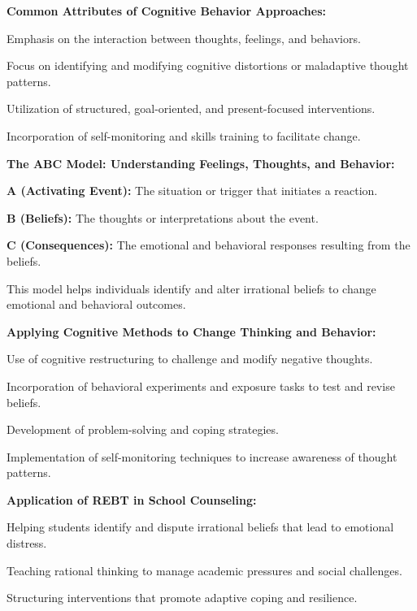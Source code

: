 \begin{coloredlist}

    \item \textbf{Common Attributes of Cognitive Behavior Approaches:}
    \begin{coloredlist}
        \item Emphasis on the interaction between thoughts, feelings, and behaviors.
        \item Focus on identifying and modifying cognitive distortions or maladaptive thought patterns.
        \item Utilization of structured, goal-oriented, and present-focused interventions.
        \item Incorporation of self-monitoring and skills training to facilitate change.
    \end{coloredlist}

    \item \textbf{The ABC Model: Understanding Feelings, Thoughts, and Behavior:}
    \begin{coloredlist}
        \item \textbf{A (Activating Event):} The situation or trigger that initiates a reaction.
        \item \textbf{B (Beliefs):} The thoughts or interpretations about the event.
        \item \textbf{C (Consequences):} The emotional and behavioral responses resulting from the beliefs.
        \item This model helps individuals identify and alter irrational beliefs to change emotional and behavioral outcomes.
    \end{coloredlist}

    \item \textbf{Applying Cognitive Methods to Change Thinking and Behavior:}
    \begin{coloredlist}
        \item Use of cognitive restructuring to challenge and modify negative thoughts.
        \item Incorporation of behavioral experiments and exposure tasks to test and revise beliefs.
        \item Development of problem-solving and coping strategies.
        \item Implementation of self-monitoring techniques to increase awareness of thought patterns.
    \end{coloredlist}

    \item \textbf{Application of REBT in School Counseling:}
    \begin{coloredlist}
        \item Helping students identify and dispute irrational beliefs that lead to emotional distress.
        \item Teaching rational thinking to manage academic pressures and social challenges.
        \item Structuring interventions that promote adaptive coping and resilience.
    \end{coloredlist}


\end{coloredlist}
